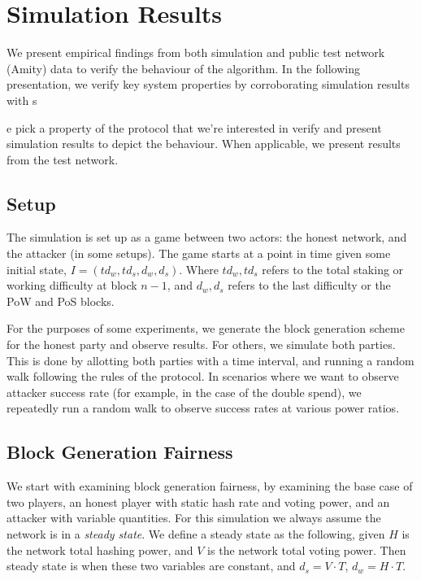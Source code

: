 \section{Simulation Results}
\label{results}

We present empirical findings from both simulation and public test network (Amity) data to verify the behaviour of the algorithm. In the following presentation, we verify key system properties by corroborating simulation results with  s

e pick a property of the protocol that we're interested in verify and present simulation results to depict the behaviour. When applicable, we present results from the test network.

\subsection{Setup}

The simulation is set up as a game between two actors: the honest network, and
the attacker (in some setups). The game starts at a point in time given some initial state,
$I=(td_w,td_s,d_w,d_s)$. Where $td_w, td_s$ refers to the total staking or
working difficulty at block $n-1$, and $d_w, d_s$ refers to the last difficulty
or the PoW and PoS blocks.

For the purposes of some experiments, we generate the block generation scheme
for the honest party and observe results. For others, we simulate both parties. This
is done by allotting both parties with a time interval, and running a
random walk following the rules of the protocol. In scenarios where we want to
observe attacker success rate (for example, in the case of the double spend), we
repeatedly run a random walk to observe success rates at various power ratios.

\subsection{Block Generation Fairness}

We start with examining block generation fairness, by examining the base case of two players, an honest player with static hash rate and voting power, and an attacker with variable quantities. For this simulation we always assume the network is in a \textit{steady state}. We define a steady state as the following, given $H$ is the network total hashing power, and $V$ is the network total voting power. Then steady state is when these two variables are constant, and $d_s = V \cdot T$, $d_w = H \cdot T$.

